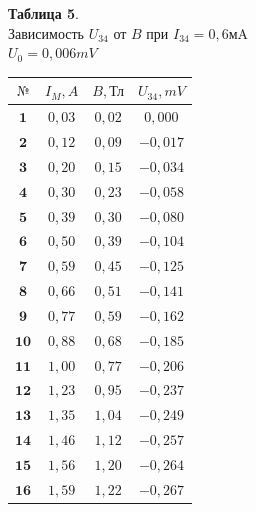\documentclass[11pt,a4paper]{article}
\begin{document}
\begin{paracol}{2}
\begin{table}[t!]
\begin{center}
	\textbf{Таблица 5}. \\ Зависимость $U_{34}$ от $B$ при $I_{34} = 0,6 \text{мA}$\\
	$U_0 = 0,006 mV$
	\\
	\begin{tabular}{|c|c|c|c|} 
		\hline 
		$\text{№}$ & $I_M,A$ & $B,\text{Тл}$ & $U_{34},mV$ \\ \hline 
		$\textbf{1}$ & $0,03$ & $0,02$ & $0,000$ \\ \hline 
		$\textbf{2}$ & $0,12$ & $0,09$ & $-0,017$ \\ \hline 
		$\textbf{3}$ & $0,20$ & $0,15$ & $-0,034$ \\ \hline 
		$\textbf{4}$ & $0,30$ & $0,23$ & $-0,058$ \\ \hline 
		$\textbf{5}$ & $0,39$ & $0,30$ & $-0,080$ \\ \hline 
		$\textbf{6}$ & $0,50$ & $0,39$ & $-0,104$ \\ \hline 
		$\textbf{7}$ & $0,59$ & $0,45$ & $-0,125$ \\ \hline 
		$\textbf{8}$ & $0,66$ & $0,51$ & $-0,141$ \\ \hline 
		$\textbf{9}$ & $0,77$ & $0,59$ & $-0,162$ \\ \hline 
		$\textbf{10}$ & $0,88$ & $0,68$ & $-0,185$ \\ \hline 
		$\textbf{11}$ & $1,00$ & $0,77$ & $-0,206$ \\ \hline 
		$\textbf{12}$ & $1,23$ & $0,95$ & $-0,237$ \\ \hline 
		$\textbf{13}$ & $1,35$ & $1,04$ & $-0,249$ \\ \hline 
		$\textbf{14}$ & $1,46$ & $1,12$ & $-0,257$ \\ \hline 
		$\textbf{15}$ & $1,56$ & $1,20$ & $-0,264$ \\ \hline 
		$\textbf{16}$ & $1,59$ & $1,22$ & $-0,267$ \\ \hline 
	\end{tabular} 
\end{center} 
\end{table}
\end{paracol}
\end{document}
